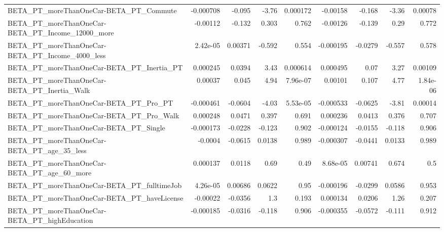 \begin{tabular}{lrrrrrrrr}
BETA\_PT\_moreThanOneCar-BETA\_PT\_Commute             &   -0.000708 &       -0.095 &    -3.76 & 0.000172 &   -0.00158 &      -0.168 &        -3.36 &       0.00078 \\
BETA\_PT\_moreThanOneCar-BETA\_PT\_Income\_12000\_more   &    -0.00112 &       -0.132 &    0.303 &    0.762 &   -0.00126 &      -0.139 &         0.29 &         0.772 \\
BETA\_PT\_moreThanOneCar-BETA\_PT\_Income\_4000\_less    &    2.42e-05 &      0.00371 &   -0.592 &    0.554 &  -0.000195 &     -0.0279 &       -0.557 &         0.578 \\
BETA\_PT\_moreThanOneCar-BETA\_PT\_Inertia\_PT          &    0.000245 &       0.0394 &     3.43 & 0.000614 &   0.000495 &        0.07 &         3.27 &       0.00109 \\
BETA\_PT\_moreThanOneCar-BETA\_PT\_Inertia\_Walk        &     0.00037 &        0.045 &     4.94 & 7.96e-07 &    0.00101 &       0.107 &         4.77 &      1.84e-06 \\
BETA\_PT\_moreThanOneCar-BETA\_PT\_Pro\_PT              &   -0.000461 &      -0.0604 &    -4.03 & 5.53e-05 &  -0.000533 &     -0.0625 &        -3.81 &       0.00014 \\
BETA\_PT\_moreThanOneCar-BETA\_PT\_Pro\_Walk            &    0.000248 &       0.0471 &    0.397 &    0.691 &   0.000236 &      0.0413 &        0.376 &         0.707 \\
BETA\_PT\_moreThanOneCar-BETA\_PT\_Single              &   -0.000173 &      -0.0228 &   -0.123 &    0.902 &  -0.000124 &     -0.0155 &       -0.118 &         0.906 \\
BETA\_PT\_moreThanOneCar-BETA\_PT\_age\_35\_less         &     -0.0004 &      -0.0615 &   0.0138 &    0.989 &  -0.000307 &     -0.0441 &       0.0133 &         0.989 \\
BETA\_PT\_moreThanOneCar-BETA\_PT\_age\_60\_more         &    0.000137 &       0.0118 &     0.69 &     0.49 &   8.68e-05 &     0.00741 &        0.674 &           0.5 \\
BETA\_PT\_moreThanOneCar-BETA\_PT\_fulltimeJob         &    4.26e-05 &      0.00686 &   0.0622 &     0.95 &  -0.000196 &     -0.0299 &       0.0586 &         0.953 \\
BETA\_PT\_moreThanOneCar-BETA\_PT\_haveLicense         &    -0.00022 &      -0.0356 &      1.3 &    0.193 &   0.000134 &      0.0206 &         1.26 &         0.207 \\
BETA\_PT\_moreThanOneCar-BETA\_PT\_highEducation       &   -0.000185 &      -0.0316 &   -0.118 &    0.906 &  -0.000355 &     -0.0572 &       -0.111 &         0.912 \\

\end{tabular}
